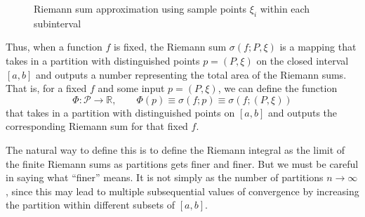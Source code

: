 \begin{definition}
\begin{figure}[H]
      \caption{Riemann sum approximation using sample points $\xi_i$ within each subinterval}
      \label{fig:riemann-sum-xi}
    \end{figure}

    Thus, when a function $f$ is fixed, the Riemann sum $\sigma (f; P, \xi)$ is a mapping that takes in a partition with distinguished points $p = (P, \xi)$ on the closed interval $[a, b]$ and outputs a number representing the total area of the Riemann sums. That is, for a fixed $f$ and some input $p = (P, \xi)$, we can define the function 
    \[\Phi: \mathcal{P} \longrightarrow \mathbb{R}, \qquad \Phi(p) \equiv \sigma(f; p) \equiv \sigma(f; (P, \xi))\]
    that takes in a partition with distinguished points on $[a,b]$ and outputs the corresponding Riemann sum for that fixed $f$. 
  \end{definition} 

  The natural way to define this is to define the Riemann integral as the limit of the finite Riemann sums as partitions gets finer and finer.  But we must be careful in saying what ``finer'' means. It is not simply as the number of partitions $n \rightarrow \infty$, since this may lead to multiple subsequential values of convergence by increasing the partition within different subsets of $[a,b]$. 

